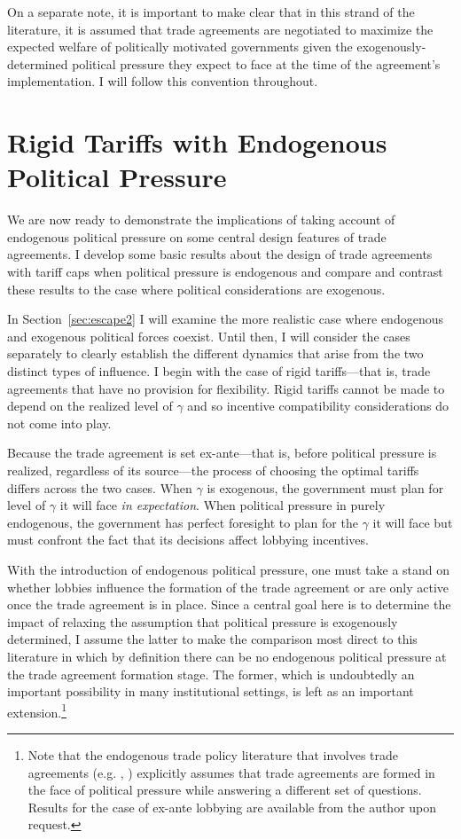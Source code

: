 \documentclass[12pt]{article}
\newcommand{\ga}{\gamma}
\begin{document}
On a separate note, it is important to make clear that in this strand of the literature, it is assumed that trade agreements are negotiated to maximize the expected welfare of politically motivated governments given the exogenously-determined political pressure they expect to face at the time of the agreement's implementation. I will follow this convention throughout.




\section{Rigid Tariffs with Endogenous Political Pressure}
\label{sec:rigid}
We are now ready to demonstrate the implications of taking account of endogenous political pressure on some central design features of trade agreements. I develop some basic results about the design of trade agreements with tariff caps when political pressure is endogenous and compare and contrast these results to the case where political considerations are exogenous.

In Section~\ref{sec:escape2} I will examine the more realistic case where endogenous and exogenous political forces coexist. Until then, I will consider the cases separately to clearly establish the different dynamics that arise from the two distinct types of influence. I begin with the case of rigid tariffs---that is, trade agreements that have no provision for flexibility. Rigid tariffs cannot be made to depend on the realized level of $\ga$ and so incentive compatibility considerations do not come into play.

Because the trade agreement is set ex-ante---that is, before political pressure is realized, regardless of its source---the process of choosing the optimal tariffs differs across the two cases. When $\ga$ is exogenous, the government must plan for level of $\ga$ it will face \textit{in expectation}. When political pressure in purely endogenous, the government has perfect foresight to plan for the $\ga$ it will face but must confront the fact that its decisions affect lobbying incentives.

With the introduction of endogenous political pressure, one must take a stand on whether lobbies influence the formation of the trade agreement or are only active once the trade agreement is in place. Since a central goal here is to determine the impact of relaxing the assumption that political pressure is exogenously determined, I assume the latter to make the comparison most direct to this literature in which by definition there can be no endogenous political pressure at the trade agreement formation stage. The former, which is undoubtedly an important possibility in many institutional settings, is left as an important extension.\footnote{Note that the endogenous trade policy literature that involves trade agreements (e.g. \Textcite{gh95}, \Textcite{mrc2007}) explicitly assumes that trade agreements are formed in the face of political pressure while answering a different set of questions. Results for the case of ex-ante lobbying are available from the author upon request.}
\end{document}
